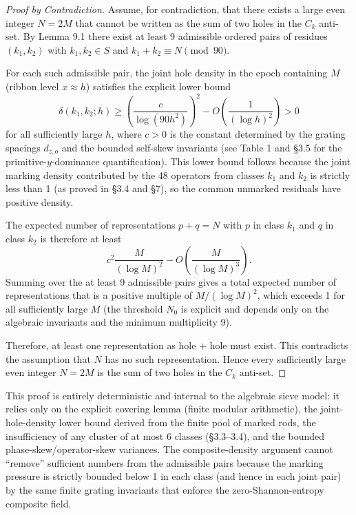 \documentclass[11pt,a4paper]{article}
\begin{document}
\begin{proof}[Proof by Contradiction]
Assume, for contradiction, that there exists a large even integer \(N=2M\) that cannot be written as the sum of two holes in the \(C_k\) anti-set. By Lemma 9.1 there exist at least 9 admissible ordered pairs of residues \((k_1,k_2)\) with \(k_1,k_2\in S\) and \(k_1+k_2\equiv N\pmod{90}\).

For each such admissible pair, the joint hole density in the epoch containing \(M\) (ribbon level \(x\approx h\)) satisfies the explicit lower bound
\[
\delta(k_1,k_2;h)\ge\left(\frac{c}{\log(90h^2)}\right)^2-O\left(\frac{1}{(\log h)^2}\right)>0
\]
for all sufficiently large \(h\), where \(c>0\) is the constant determined by the grating spacings \(d_{z,o}\) and the bounded self-skew invariants (see Table 1 and §3.5 for the primitive-\(y\)-dominance quantification). This lower bound follows because the joint marking density contributed by the 48 operators from classes \(k_1\) and \(k_2\) is strictly less than 1 (as proved in §3.4 and §7), so the common unmarked residuals have positive density.

The expected number of representations \(p+q=N\) with \(p\) in class \(k_1\) and \(q\) in class \(k_2\) is therefore at least
\[
c^2\frac{M}{(\log M)^2}-O\left(\frac{M}{(\log M)^3}\right).
\]
Summing over the at least 9 admissible pairs gives a total expected number of representations that is a positive multiple of \(M/(\log M)^2\), which exceeds 1 for all sufficiently large \(M\) (the threshold \(N_0\) is explicit and depends only on the algebraic invariants and the minimum multiplicity 9).

Therefore, at least one representation as hole + hole must exist. This contradicts the assumption that \(N\) has no such representation. Hence every sufficiently large even integer \(N=2M\) is the sum of two holes in the \(C_k\) anti-set.
\end{proof}

This proof is entirely deterministic and internal to the algebraic sieve model: it relies only on the explicit covering lemma (finite modular arithmetic), the joint-hole-density lower bound derived from the finite pool of marked rods, the insufficiency of any cluster of at most 6 classes (§3.3–3.4), and the bounded phase-skew/operator-skew variances. The composite-density argument cannot “remove” sufficient numbers from the admissible pairs because the marking pressure is strictly bounded below 1 in each class (and hence in each joint pair) by the same finite grating invariants that enforce the zero-Shannon-entropy composite field.
\end{document}
